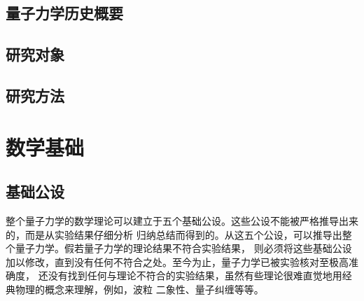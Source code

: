 \documentclass[type=bachelor]{wuthesis}
\begin{document}
\section{量子力学历史概要}

\section{研究对象}

\section{研究方法}

\chapter{数学基础}

\section{基础公设}

整个量子力学的数学理论可以建立于五个基础公设。这些公设不能被严格推导出来的，而是从实验结果仔细分析
归纳总结而得到的。从这五个公设，可以推导出整个量子力学。假若量子力学的理论结果不符合实验结果，
则必须将这些基础公设加以修改，直到没有任何不符合之处。至今为止，量子力学已被实验核对至极高准确度，
还没有找到任何与理论不符合的实验结果，虽然有些理论很难直觉地用经典物理的概念来理解，例如，波粒
二象性、量子纠缠等等\cite{zurek2014quantum,cohen2013claude,zettili2003quantum}。
\end{document}

